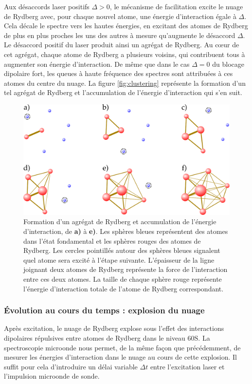 Aux désaccords laser positifs $\Delta > 0$, le mécanisme de facilitation excite le nuage de Rydberg avec, pour chaque nouvel atome, une énergie d'interaction égale à $\Delta$.
Cela décale le spectre vers les hautes énergies, en excitant des atomes de Rydberg de plus en plus proches les uns des autres à mesure qu'augmente le désaccord $\Delta$.
Le désaccord positif du laser produit ainsi un agrégat de Rydberg.
Au c\oe ur de cet agrégat, chaque atome de Rydberg a plusieurs voisins, qui contribuent tous à augmenter son énergie d'interaction.
De même que dans le cas $\Delta = 0$ du blocage dipolaire fort, les queues à haute fréquence  des spectres sont attribuées à ces atomes du centre du nuage.
La figure \eqref{fig:clustering} représente la formation d'un tel agrégat de Rydberg et l'accumulation de l'énergie d'interaction qui s'en suit.
%
\begin{figure}[!h]
\centering
\includegraphics[width=.8\linewidth]{figures/low_l/accumulation_2D}
\caption[Formation d'un agrégat de Rydberg et accumulation de l'énergie d'interaction]{
Formation d'un agrégat de Rydberg et accumulation de l'énergie d'interaction, de \textbf{a)} à \textbf{e)}.
Les sphères bleues représentent des atomes dans l'état fondamental et les sphères rouges des atomes de Rydberg.
Les cercles pointillés autour des sphères bleues signalent quel atome sera excité à l'étape suivante.
L'épaisseur de la ligne joignant deux atomes de Rydberg représente la force de l'interaction entre ces deux atomes.
La taille de chaque sphère rouge représente l'énergie d'interaction totale de l'atome de Rydberg correspondant.
}
\label{fig:clustering}
\end{figure}
%

\subsubsection*{Évolution au cours du temps : explosion du nuage}
\noindent Après excitation, le nuage de Rydberg explose sous l'effet des interactions dipolaires répulsives entre atomes de Rydberg dans le niveau $\mathrm{60S}$.
La spectroscopie microonde nous permet, de la même façon que précédemment, de mesurer les énergies d'interaction dans le nuage au cours de cette explosion.
Il suffit pour cela d'introduire un délai variable $\Delta t$ entre l'excitation laser et l'impulsion microonde de sonde.

